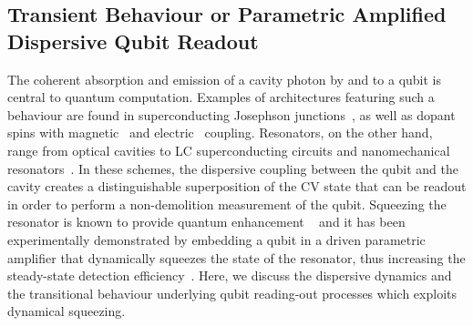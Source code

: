 \documentclass[%
reprint,
superscriptaddress,
nofootinbib,
 amsmath,amssymb,
prx,
floatfix,
]{revtex4-2}
\begin{document}
\subsection{Transient Behaviour or
 Parametric Amplified Dispersive Qubit Readout\label{subsec:atom}}



The coherent absorption and emission of a cavity photon by and to a qubit is central to quantum computation. Examples of architectures featuring such a behaviour are found in superconducting Josephson junctions~\cite{strong_wallraff_2004,coherent_chiorescu_2004,coupling_majer_2007,blais_quantum_2007}, as well as dopant spins with magnetic~\cite{strong_kubo_2010,strong_chen_2018,realization_liu_2023} and electric~\cite{strong_samkharadze_2018,strong_samkharadze_2018,coherent_mi_2018,coherent_landig_2018} coupling.  Resonators, on the other hand, range from optical cavities to LC superconducting circuits and nanomechanical resonators~\cite{xiang_hybrid_2013}.
In these schemes, the dispersive coupling between the qubit and the cavity creates a distinguishable superposition of the CV state that can be readout in order to perform a non-demolition measurement of the qubit.  Squeezing the resonator is known to provide quantum enhancement ~\cite{Entanglement_Wahyu_2008,Sete2013,Szorkovszky_2014,didier_fast_2015,walter_rapid_2017,kam_fast_2024} and it has been experimentally demonstrated by embedding a qubit in a driven parametric amplifier that dynamically squeezes the state of the resonator, thus increasing the steady-state detection efficiency~\cite{eddins_high_2019}. Here, we discuss the dispersive dynamics and the transitional behaviour underlying qubit reading-out processes which exploits dynamical squeezing.



\end{document}
